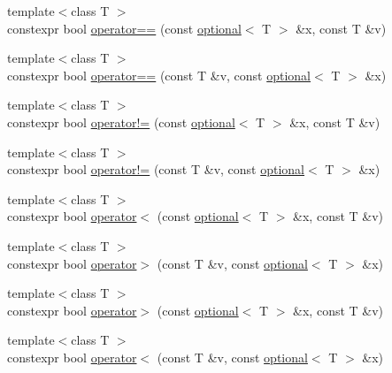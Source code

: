 \begin{DoxyCompactItemize}
\item 
{\footnotesize template$<$class T $>$ }\\constexpr bool \mbox{\hyperlink{namespacestd_1_1experimental_ad40f3ff2c6562139fe910ab3d0a63f10}{operator==}} (const \mbox{\hyperlink{classstd_1_1experimental_1_1optional}{optional}}$<$ T $>$ \&x, const T \&v)
\item 
{\footnotesize template$<$class T $>$ }\\constexpr bool \mbox{\hyperlink{namespacestd_1_1experimental_a1958e649d145d612bc04a821d28c0ffb}{operator==}} (const T \&v, const \mbox{\hyperlink{classstd_1_1experimental_1_1optional}{optional}}$<$ T $>$ \&x)
\item 
{\footnotesize template$<$class T $>$ }\\constexpr bool \mbox{\hyperlink{namespacestd_1_1experimental_a65194017839ffdd2eeeb2f8f510d9a84}{operator!=}} (const \mbox{\hyperlink{classstd_1_1experimental_1_1optional}{optional}}$<$ T $>$ \&x, const T \&v)
\item 
{\footnotesize template$<$class T $>$ }\\constexpr bool \mbox{\hyperlink{namespacestd_1_1experimental_aa6a14a4a2f99c053eaf12e4d438786cc}{operator!=}} (const T \&v, const \mbox{\hyperlink{classstd_1_1experimental_1_1optional}{optional}}$<$ T $>$ \&x)
\item 
{\footnotesize template$<$class T $>$ }\\constexpr bool \mbox{\hyperlink{namespacestd_1_1experimental_acd496ce7fb815b5ed07c64c3c50473a5}{operator$<$}} (const \mbox{\hyperlink{classstd_1_1experimental_1_1optional}{optional}}$<$ T $>$ \&x, const T \&v)
\item 
{\footnotesize template$<$class T $>$ }\\constexpr bool \mbox{\hyperlink{namespacestd_1_1experimental_a2c15354bc231381036462b92afd3737e}{operator$>$}} (const T \&v, const \mbox{\hyperlink{classstd_1_1experimental_1_1optional}{optional}}$<$ T $>$ \&x)
\item 
{\footnotesize template$<$class T $>$ }\\constexpr bool \mbox{\hyperlink{namespacestd_1_1experimental_acd392a8263ad2dd322655078d53e77ad}{operator$>$}} (const \mbox{\hyperlink{classstd_1_1experimental_1_1optional}{optional}}$<$ T $>$ \&x, const T \&v)
\item 
{\footnotesize template$<$class T $>$ }\\constexpr bool \mbox{\hyperlink{namespacestd_1_1experimental_a1d3cd046025f9693e0c6c7e57c67e379}{operator$<$}} (const T \&v, const \mbox{\hyperlink{classstd_1_1experimental_1_1optional}{optional}}$<$ T $>$ \&x)

\end{DoxyCompactItemize}
